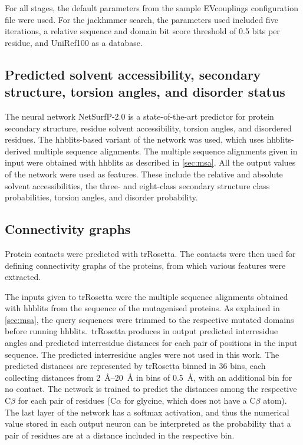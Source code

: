 For all stages, the default parameters from the sample EVcouplings configuration file were used.
For the jackhmmer search, the parameters used included five iterations, a relative sequence and domain bit score threshold of 0.5 bits per residue, and UniRef100 as a database.

\subsection{Predicted solvent accessibility, secondary structure, torsion angles, and disorder status}
The neural network NetSurfP-2.0 is a state-of-the-art predictor for protein secondary structure, residue solvent accessibility, torsion angles, and disordered residues.
The hhblits-based variant of the network was used, which uses hhblits-derived multiple sequence alignments.
The multiple sequence alignments given in input were obtained with hhblits as described in \autoref{sec:msa}.
All the output values of the network were used as features.
These include the relative and absolute solvent accessibilities, the three- and eight-class secondary structure class probabilities, torsion angles, and disorder probability.

\subsection{Connectivity graphs}
Protein contacts were predicted with trRosetta.
The contacts were then used for defining connectivity graphs of the proteins, from which various features were extracted.

The inputs given to trRosetta were the multiple sequence alignments obtained with hhblits from the sequence of the mutagenised proteins.
As explained in \autoref{sec:msa}, the query sequences were trimmed to the respective mutated domains before running hhblits.\
trRosetta produces in output predicted interresidue angles and predicted interresidue distances for each pair of positions in the input sequence.
The predicted interresidue angles were not used in this work.
The predicted distances are represented by trRosetta binned in 36 bins, each collecting distances from \SIrange{2}{20}{\angstrom} in bins of \SI{0.5}{\angstrom}, with an additional bin for no contact.
The network is trained to predict the distances among the respective C$\beta$ for each pair of residues (C$\alpha$ for glycine, which does not have a C$\beta$ atom).
The last layer of the network has a softmax activation, and thus the numerical value stored in each output neuron can be interpreted as the probability that a pair of residues are at a distance included in the respective bin.

